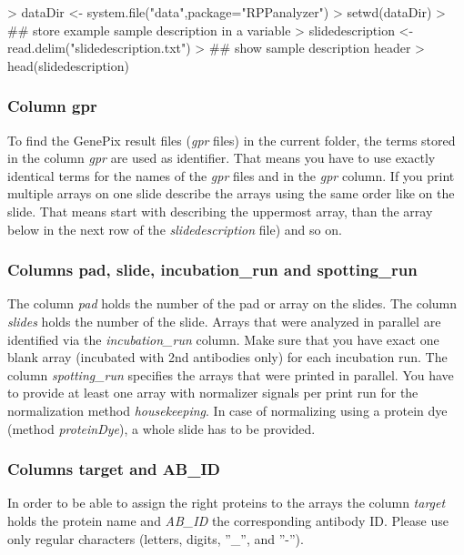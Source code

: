 \documentclass[12pt]{article}
\newcommand{\Rfunarg}[1]{{\textit{#1}}}
\begin{document}
\begin{Schunk}
\begin{Sinput}
> dataDir <- system.file("data",package="RPPanalyzer")
> setwd(dataDir)
> ## store example sample description in a variable
> slidedescription <- read.delim("slidedescription.txt")
> ## show sample description header
> head(slidedescription)
\end{Sinput}
\end{Schunk}

\subsubsection{Column gpr}

To find the GenePix result files (\emph{gpr} files) in the current folder, the terms stored in the column \Rfunarg{gpr} are used as identifier. That means you have to use exactly identical terms for the names of the \emph{gpr} files and in the \Rfunarg{gpr} column.
If you print multiple arrays on one slide describe the arrays using the same order like on the slide. That means start with describing the uppermost array, than the array below in the next row of the \emph{slidedescription} file) and so on.

\subsubsection{Columns pad, slide, incubation\_run and spotting\_run}

The column \Rfunarg{pad} holds the number of the pad or array on the slides. The column \Rfunarg{slides}
holds the number of the slide. Arrays that were analyzed in parallel are identified
via the \Rfunarg{incubation\_run} column. Make sure that you have exact one blank array (incubated with 2nd antibodies only)
for each incubation run. The column \Rfunarg{spotting\_run} specifies the arrays that were
printed in parallel. You have to provide at least one array with normalizer signals per print run
for the normalization method \Rfunarg{housekeeping}. In case of normalizing using a protein dye (method \Rfunarg{proteinDye}), a whole slide has to be provided.

\subsubsection{Columns target and AB\_ID}

In order to be able to assign the right proteins to the arrays the column \Rfunarg{target} holds the protein name and \Rfunarg{AB\_ID} the corresponding antibody ID. Please use only regular characters (letters, digits, ''\_'', and ''-'').
\end{document}
